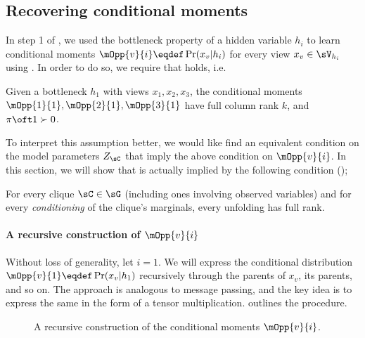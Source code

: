 \subsection{Recovering conditional moments}
\label{app:assumption-proof}

In step 1 of \LearnMarginals, we used the bottleneck property of a hidden
  variable $h_i$ to learn conditional moments $\mOpp{v}{i} \eqdef
  \Pr(x_v | h_i)$ for every view $x_v \in \sV_{h_i}$ using
  \TensorFactorize. 
In order to do so, we require that  holds, i.e.
\begin{assumption*}
  Given a bottleneck $h_1$ with views $x_1, x_2, x_3$, the conditional
  moments $\mOpp{1}{1}, \mOpp{2}{1}, \mOpp{3}{1}$ have full column rank
  $k$, and $\pi\oft 1 \succ 0$.
\end{assumption*}

To interpret this assumption better, we would like find an equivalent
condition on the model parameters $Z_\sC$ that imply the above condition
on $\mOpp{v}{i}$. In this section, we will show that
 is actually implied by the following condition
();
\begin{assumption*}
For every clique $\sC \in \sG$ (including ones involving observed
  variables) and for every {\em conditioning} of the clique's marginals,
  every unfolding has full rank. 
\end{assumption*}

\paragraph{A recursive construction of $\mOpp{v}{i}$}

Without loss of generality, let $i = 1$. We will express the conditional
distribution $\mOpp{v}{1} \eqdef \Pr(x_v | h_1)$ recursively through the
parents of $x_v$, its parents, and so on. The approach is analogous to
message passing, and the key idea is to express the same in the form of
a tensor multiplication.  outlines the
procedure.

\begin{figure}
  \caption{A recursive construction of the conditional moments $\mOpp{v}{i}$.}
  \label{fig:message-proof}
\end{figure}

